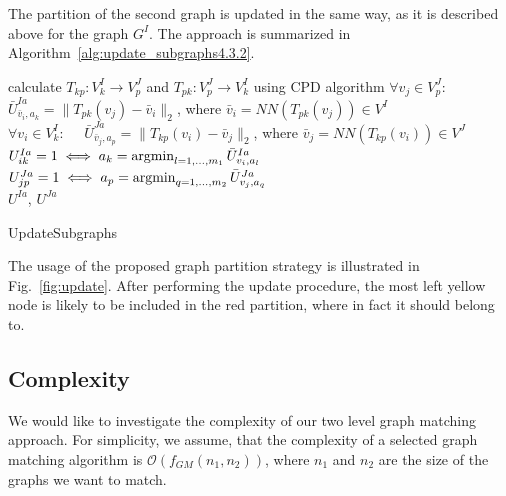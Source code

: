 The partition of the second graph is updated in the same way, as it is described above for the graph $G^I$. The approach is summarized in Algorithm~\ref{alg:update_subgraphs4.3.2}.

\begin{algorithm}[h]
	{
		calculate $T_{kp}:V^I_k\rightarrow V^J_p$ and $T_{pk}:V^J_p\rightarrow V^I_k$ using CPD algorithm
	}
	{
		$\forall v_j\in V^J_p:\quad$ $\bar{U}^{Ia}_{\bar{v}_i,a_k}=\|T_{pk}(v_j)-\bar{v}_i\|_2$, where $\bar{v}_i=NN(T_{pk}(v_j))\in V^I$\\
		$\forall v_i\in V^I_k:\quad$ $\bar{U}^{Ja}_{\bar{v}_j,a_p}=\|T_{kp}(v_i)-\bar{v}_j\|_2$, where $\bar{v}_j=NN(T_{kp}(v_i))\in V^J$
	}
	$U^{Ia}_{ik}=1 \iff a_k=\mathop{\rm argmin}_{l=1,\dots,m_1}^{}{\bar{U}^{Ia}_{v_i,a_l}}$\\
	$U^{Ja}_{jp}=1 \iff a_p=\mathop{\rm argmin}_{q=1,\dots,m_2}^{}{\bar{U}^{Ja}_{v_j,a_q}}$\\
	\Return $U^{Ia}$, $U^{Ja}$
	
	\caption{UpdateSubgraphs}    \label{alg:update_subgraphs4.3.2}
\end{algorithm}

The usage of the proposed graph partition strategy is illustrated in Fig.~\ref{fig:update}. After performing the update procedure, the most left yellow node is likely to be included in the red partition, where in fact it should belong to.
\FloatBarrier
\subsection{Complexity}
We would like to investigate the  complexity of our two level graph matching approach. For simplicity, we assume, that the complexity of a selected graph matching algorithm is $\mathcal{O}(f_{GM}(n_1,n_2))$, where $n_1$ and $n_2$ are the size of the graphs we want to match.

